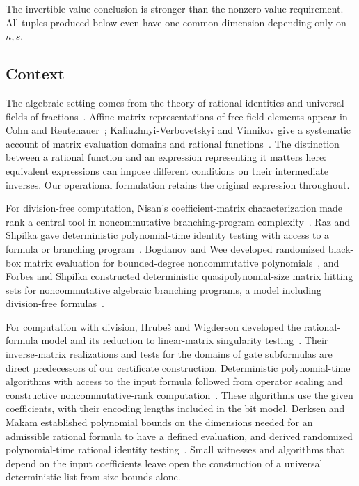 The invertible-value conclusion is stronger than the nonzero-value requirement. All tuples produced below even have one common dimension depending only on $n,s$.

\subsection{Context}
The algebraic setting comes from the theory of rational identities
and universal fields of fractions~\citep{Amitsur66,Cohn06}.
Affine-matrix representations of free-field elements appear in
Cohn and Reutenauer~\citep[Section~3.1]{CR94};
Kaliuzhnyi-Verbovetskyi and Vinnikov give a systematic account of
matrix evaluation domains and rational functions~\citep[Section~2]{KVV10}.
The distinction between a rational function and an expression
representing it matters here: equivalent expressions can impose
different conditions on their intermediate inverses. Our operational
formulation retains the original expression throughout.

For division-free computation, Nisan's coefficient-matrix
characterization made rank a central tool in noncommutative
branching-program complexity~\citep{Nisan91}.
Raz and Shpilka gave deterministic polynomial-time identity testing
with access to a formula or branching program~\citep{RS05}.
Bogdanov and Wee developed randomized black-box matrix evaluation
for bounded-degree noncommutative polynomials~\citep{BW05}, and
Forbes and Shpilka constructed deterministic quasipolynomial-size
matrix hitting sets for noncommutative algebraic branching programs,
a model including division-free formulas~\citep{FS13}.

For computation with division, Hrube\v{s} and Wigderson developed
the rational-formula model and its reduction to linear-matrix
singularity testing~\citep{HW15}. Their inverse-matrix realizations
and tests for the domains of gate subformulas are direct predecessors
of our certificate construction. Deterministic polynomial-time
algorithms with access to the input formula followed from operator
scaling and constructive noncommutative-rank
computation~\citep{GGOW16,GGOW20,IQS18}. These algorithms use the
given coefficients, with their encoding lengths included in the
bit model. Derksen and Makam established polynomial bounds on the
dimensions needed for an admissible rational formula to have a
defined evaluation, and derived randomized polynomial-time rational
identity testing~\citep[Section~6]{DM17}. Small witnesses and
algorithms that depend on the input coefficients leave open the
construction of a universal deterministic list from size bounds alone.

